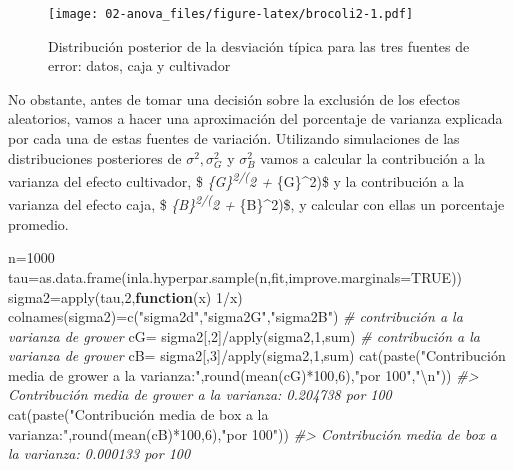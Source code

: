 \documentclass[
]{book}
\newenvironment{Shaded}{\begin{snugshade}}{\end{snugshade}}
\newcommand{\AttributeTok}[1]{\textcolor[rgb]{0.77,0.63,0.00}{#1}}
\newcommand{\CommentTok}[1]{\textcolor[rgb]{0.56,0.35,0.01}{\textit{#1}}}
\newcommand{\ConstantTok}[1]{\textcolor[rgb]{0.00,0.00,0.00}{#1}}
\newcommand{\ControlFlowTok}[1]{\textcolor[rgb]{0.13,0.29,0.53}{\textbf{#1}}}
\newcommand{\DecValTok}[1]{\textcolor[rgb]{0.00,0.00,0.81}{#1}}
\newcommand{\FunctionTok}[1]{\textcolor[rgb]{0.00,0.00,0.00}{#1}}
\newcommand{\NormalTok}[1]{#1}
\newcommand{\OtherTok}[1]{\textcolor[rgb]{0.56,0.35,0.01}{#1}}
\newcommand{\SpecialCharTok}[1]{\textcolor[rgb]{0.00,0.00,0.00}{#1}}
\newcommand{\StringTok}[1]{\textcolor[rgb]{0.31,0.60,0.02}{#1}}
\begin{document}
\begin{figure}
\centering
\texttt{[image: 02-anova\_files/figure-latex/brocoli2-1.pdf]}
\caption{\label{fig:brocoli2}Distribución posterior de la desviación típica para las tres fuentes de error: datos, caja y cultivador}
\end{figure}

No obstante, antes de tomar una decisión sobre la exclusión de los efectos aleatorios, vamos a hacer una aproximación del porcentaje de varianza explicada por cada una de estas fuentes de variación. Utilizando simulaciones de las distribuciones posteriores de \(\sigma^2, \sigma_{G}^2\) y \(\sigma_{B}^2\) vamos a calcular la contribución a la varianza del efecto cultivador, \$ \sigma\emph{\{G\}\textsuperscript{2/(\sigma}2 + \sigma}\{G\}\^{}2)\$ y la contribución a la varianza del efecto caja, \$ \sigma\emph{\{B\}\textsuperscript{2/(\sigma}2 + \sigma}\{B\}\^{}2)\$, y calcular con ellas un porcentaje promedio.

\begin{Shaded}
\begin{Highlighting}[]
\NormalTok{n}\OtherTok{=}\DecValTok{1000}
\NormalTok{tau}\OtherTok{=}\FunctionTok{as.data.frame}\NormalTok{(}\FunctionTok{inla.hyperpar.sample}\NormalTok{(n,fit,}\AttributeTok{improve.marginals=}\ConstantTok{TRUE}\NormalTok{))}
\NormalTok{sigma2}\OtherTok{=}\FunctionTok{apply}\NormalTok{(tau,}\DecValTok{2}\NormalTok{,}\ControlFlowTok{function}\NormalTok{(x) }\DecValTok{1}\SpecialCharTok{/}\NormalTok{x)}
\FunctionTok{colnames}\NormalTok{(sigma2)}\OtherTok{=}\FunctionTok{c}\NormalTok{(}\StringTok{"sigma2d"}\NormalTok{,}\StringTok{"sigma2G"}\NormalTok{,}\StringTok{"sigma2B"}\NormalTok{)}
\CommentTok{\# contribución a la varianza de grower}
\NormalTok{cG}\OtherTok{=}\NormalTok{ sigma2[,}\DecValTok{2}\NormalTok{]}\SpecialCharTok{/}\FunctionTok{apply}\NormalTok{(sigma2,}\DecValTok{1}\NormalTok{,sum)}
\CommentTok{\# contribución a la varianza de grower}
\NormalTok{cB}\OtherTok{=}\NormalTok{ sigma2[,}\DecValTok{3}\NormalTok{]}\SpecialCharTok{/}\FunctionTok{apply}\NormalTok{(sigma2,}\DecValTok{1}\NormalTok{,sum)}
\FunctionTok{cat}\NormalTok{(}\FunctionTok{paste}\NormalTok{(}\StringTok{"Contribución media de grower a la varianza:"}\NormalTok{,}\FunctionTok{round}\NormalTok{(}\FunctionTok{mean}\NormalTok{(cG)}\SpecialCharTok{*}\DecValTok{100}\NormalTok{,}\DecValTok{6}\NormalTok{),}\StringTok{"por 100"}\NormalTok{,}\StringTok{"}\SpecialCharTok{\textbackslash{}n}\StringTok{"}\NormalTok{))}
\CommentTok{\#\textgreater{} Contribución media de grower a la varianza: 0.204738 por 100}
\FunctionTok{cat}\NormalTok{(}\FunctionTok{paste}\NormalTok{(}\StringTok{"Contribución media de box a la varianza:"}\NormalTok{,}\FunctionTok{round}\NormalTok{(}\FunctionTok{mean}\NormalTok{(cB)}\SpecialCharTok{*}\DecValTok{100}\NormalTok{,}\DecValTok{6}\NormalTok{),}\StringTok{"por 100"}\NormalTok{))}
\CommentTok{\#\textgreater{} Contribución media de box a la varianza: 0.000133 por 100}
\end{Highlighting}
\end{Shaded}
\end{document}

